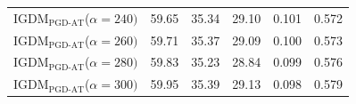 \documentclass{article} %
\begin{document}
\begin{table}[h]
\begin{tabular}{lccccc}
 IGDM$_\text{PGD-AT}$($\alpha=240)$& 59.65 & 35.34 & 29.10 & 0.101 & 0.572\\
 IGDM$_\text{PGD-AT}$($\alpha=260)$& 59.71 & 35.37 & 29.09 & 0.100 & 0.573\\
 IGDM$_\text{PGD-AT}$($\alpha=280)$& 59.83 & 35.23 & 28.84 & 0.099 & 0.576\\
 IGDM$_\text{PGD-AT}$($\alpha=300)$& 59.95 & 35.39 & 29.13 & 0.098 & 0.579\\
\bottomrule
 \end{tabular}

 \label{tab:supp_hyper_pgd}
\end{table}
\end{document}
